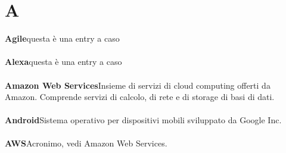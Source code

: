 \newpage
\section{A}\label{l:A}
\textbf{Agile}\newline questa è una entry a caso\\\\
\textbf{Alexa}\newline questa è una entry a caso\\\\
\textbf{Amazon Web Services}\newline Insieme di servizi di cloud computing offerti da Amazon. Comprende servizi di calcolo, di rete e di storage di basi di dati.\\\\
\textbf{Android}\newline Sistema operativo per dispositivi mobili sviluppato da Google
Inc.\\\\
\textbf{AWS}\newline Acronimo, vedi Amazon Web Services.

